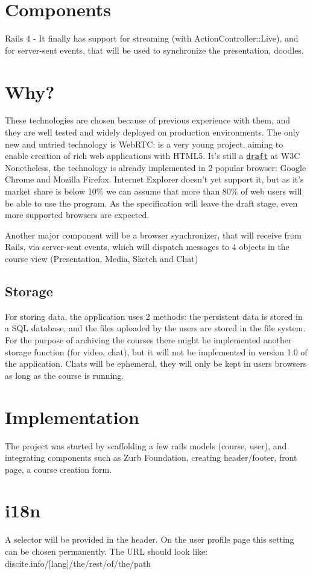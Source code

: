 \section{Components}
Rails 4 - It finally has support for streaming (with ActionController::Live),
and for server-sent events, that will be used to synchronize the presentation,
doodles.

\section{Why?}
These technologies are chosen because of previous experience with them, and they
are well tested and widely deployed on production environments.
The only new and untried technology is WebRTC: is a very young project, aiming
to enable creation of rich web applications with HTML5. It's still a
\href{http://dev.w3.org/2011/webrtc/editor/webrtc.html}{\texttt{draft}} at W3C
Nonetheless, the technology is already implemented in 2 popular browser: Google
Chrome and Mozilla Firefox.  Internet Explorer doesn't yet support it, but as
it's market share is below 10\% we can assume that more than 80\% of web users
\citep{browserStats} will be able to use the program. As the specification will
leave the draft stage, even more supported browsers are expected.


Another major component will be a browser synchronizer, that will receive
from Rails, via server-sent events, which will dispatch messages to 4 objects
in the course view (Presentation, Media, Sketch and Chat)

\subsection{Storage}
For storing data, the application uses 2 methods: the persistent data is stored
in a SQL database, and the files uploaded by the users are stored in the
file system. For the purpose of archiving the courses there might be implemented
another storage function (for video, chat), but it will not be implemented in
version 1.0 of the application. Chats will be ephemeral, they will only be kept
in users browsers as long as the course is running.

\section{Implementation}
The project was started by scaffolding a few rails models (course, user), and
integrating components such as Zurb Foundation, creating header/footer, front
page, a course creation form.

\section{i18n}
A selector will be provided in the header. On the user profile page this setting
can be chosen permanently. The URL should look like:
discite.info/[lang]/the/rest/of/the/path
